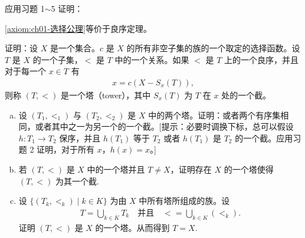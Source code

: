 \documentclass[../../main.tex]{subfiles}
\begin{document}
\begin{exercise}\label{exercise:ch01-附加良序-7}
应用习题 1$\sim$5 证明：

\begin{theorem}[选择公理等价于良序定理]\label{theorem:ch01-选择等价良序}
\cref{axiom:ch01-选择公理}等价于良序定理。
\end{theorem}

证明：设 $X$ 是一个集合。$c$ 是 $X$ 的所有非空子集的族的一个取定的选择函数。设 $T$ 是 $X$ 的一个子集，$<$ 是 $T$ 中的一个关系。如果 $<$ 是 $T$ 上的一个良序，并且对于每一个 $x \in T$ 有
\begin{align*}
x = c(X - S_{x}(T)),
\end{align*}
则称 $(T, <)$ 是一个塔（tower），其中 $S_{x}(T)$ 为 $T$ 在 $x$ 处的一个截。
\begin{enumerate}[(a)]
\item 设 $(T_{1}, <_{1})$ 与 $(T_{2}, <_{2})$ 是 $X$ 中的两个塔。证明：或者两个有序集相同，或者其中之一为另一个的一个截。[提示：必要时调换下标，总可以假设 $h: T_{1} \longrightarrow T_{2}$ 保序，并且 $h(T_{1})$ 等于 $T_{2}$ 或者 $h(T_{1})$ 是 $T_{2}$ 的一个截。应用习题 2 证明，对于所有 $x$，$h(x) = x$。]
\item 若 $(T, <)$ 是 $X$ 中的一个塔并且 $T \neq X$，证明存在 $X$ 的一个塔使得 $(T, <)$ 为其一个截.
\item 设 $\{(T_{k}, <_{k}) \mid k \in K\}$ 为由 $X$ 中所有塔所组成的族。设
\begin{align*}
T = \bigcup_{k \in K} T_{k} \quad \text{并且} \quad < = \bigcup_{k \in K} (<_{k}).
\end{align*}
证明 $(T, <)$ 是 $X$ 的一个塔。从而得到 $T = X$.
\end{enumerate}
\end{exercise}
\end{document}
